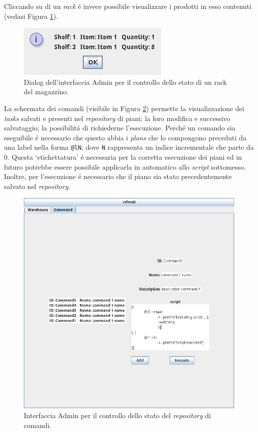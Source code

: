Cliccando su di un \textit{rack} \'e invece possibile visualizzare i prodotti in esso contenuti (vedasi Figura \ref{fig:application-rack}).
\begin{figure}[!ht]\centering
    \includegraphics[width=.75\textwidth]{section/usage_examples/figure/application-rack.png}
    \caption{Dialog dell'interfaccia Admin per il controllo dello stato di un rack del magazzino.}
    \label{fig:application-rack}
\end{figure}

\parag
La schermata dei comandi (visibile in Figura \ref{fig:application-command}) permette la visualizzazione dei \textit{tasks} salvati e presenti nel \textit{repository} di piani; la loro modifica e successivo salvataggio; la possibilit\'a di richiederne l'esecuzione. Perch\'e un comando sia eseguibile \'e necessario che questo abbia i \textit{plans} che lo compongono preceduti da una label nella forma \texttt{@lN}, dove \texttt{N} rappresenta un indice incrementale che parte da 0. Questa `etichettatura' \'e necessaria per la corretta esecuzione dei piani ed in futuro potrebbe essere possibile applicarla in automatico allo \textit{script} sottomesso. Inoltre, per l'esecuzione \'e necessario che il piano sia stato precedentemente salvato nel \textit{repository}.
\begin{figure}[!ht]\centering
    \includegraphics[width=.75\textwidth]{section/usage_examples/figure/application-command.png}
    \caption{Interfaccia Admin per il controllo dello stato del \textit{repository} di comandi.}
    \label{fig:application-command}
\end{figure}
